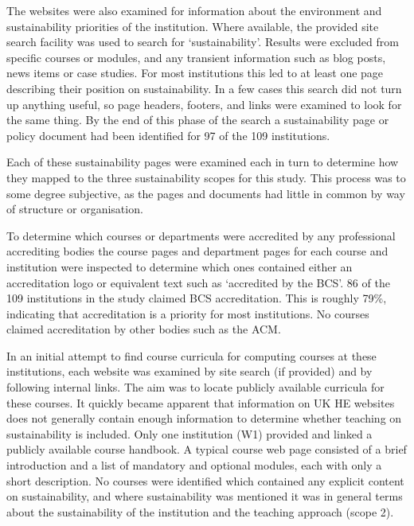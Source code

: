The websites were also examined for information about the environment and sustainability priorities of the institution. Where available, the provided site search facility was used to search for `sustainability'. Results were excluded from specific courses or modules, and any transient information such as blog posts, news items or case studies. For most institutions this led to at least one page describing their position on sustainability. In a few cases this search did not turn up anything useful, so page headers, footers, and links were examined to look for the same thing. By the end of this phase of the search a sustainability page or policy document had been identified for 97 of the 109 institutions.

Each of these sustainability pages were examined each in turn to determine how they mapped to the three sustainability scopes for this study. This process was to some degree subjective, as the pages and documents had little in common by way of structure or organisation. 

To determine which courses or departments were accredited by any professional accrediting bodies the course pages and department pages for each course and institution were inspected to determine which ones contained either an accreditation logo or equivalent text such as `accredited by the BCS'. 86 of the 109 institutions in the study claimed BCS accreditation. This is roughly 79\%, indicating that accreditation is a priority for most institutions. No courses claimed accreditation by other bodies such as the ACM.

In an initial attempt to find course curricula for computing courses at these institutions, each website was examined by site search (if provided) and by following internal links. The aim was to locate publicly available curricula for these courses. It quickly became apparent that information on UK HE websites does not generally contain enough information to determine whether teaching on sustainability is included. Only one institution (W1) provided and linked a publicly available course handbook. A typical course web page consisted of a brief introduction and a list of mandatory and optional modules, each with only a short description. No courses were identified which contained any explicit content on sustainability, and where sustainability was mentioned it was in general terms about the sustainability of the institution and the teaching approach (scope 2).

